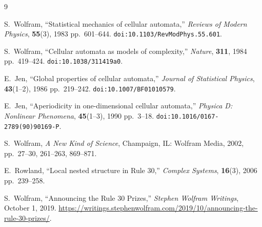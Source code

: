 \documentclass[11pt,a4paper]{article}
\theoremstyle{definition}
\theoremstyle{remark}
\begin{document}
\begin{thebibliography}{9}

S.~Wolfram, ``Statistical mechanics of cellular automata,'' \emph{Reviews of Modern Physics}, \textbf{55}(3), 1983 pp.~601--644. \texttt{doi:10.1103/RevModPhys.55.601}.

S.~Wolfram, ``Cellular automata as models of complexity,'' \emph{Nature}, \textbf{311}, 1984 pp.~419--424. \texttt{doi:10.1038/311419a0}.

E.~Jen, ``Global properties of cellular automata,'' \emph{Journal of Statistical Physics}, \textbf{43}(1--2), 1986 pp.~219--242. \texttt{doi:10.1007/BF01010579}.

E.~Jen, ``Aperiodicity in one-dimensional cellular automata,'' \emph{Physica D: Nonlinear Phenomena}, \textbf{45}(1--3), 1990 pp.~3--18. \texttt{doi:10.1016/0167-2789(90)90169-P}.

S.~Wolfram, \emph{A New Kind of Science}, Champaign, IL: Wolfram Media, 2002, pp.~27--30, 261--263, 869--871.

E.~Rowland, ``Local nested structure in Rule 30,'' \emph{Complex Systems}, \textbf{16}(3), 2006 pp.~239--258.

S.~Wolfram, ``Announcing the Rule 30 Prizes,'' \emph{Stephen Wolfram Writings}, October 1, 2019. \url{https://writings.stephenwolfram.com/2019/10/announcing-the-rule-30-prizes/}.

\end{thebibliography}
\end{document}
